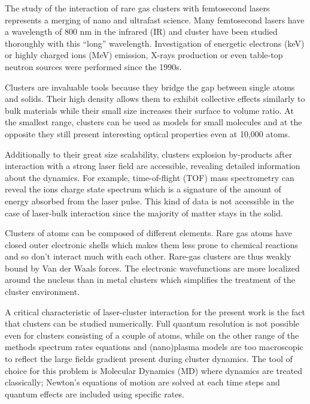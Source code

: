 The study of the interaction of rare gas clusters with femtosecond lasers represents a
merging of nano and ultrafast science.
%
Many femtosecond lasers
have a wavelength of 800 nm in the infrared (IR) and cluster have been studied
thoroughly with this ``long'' wavelength. Investigation of energetic
electrons (keV) or highly charged ions (MeV) emission, X-rays production or even
table-top neutron sources\cite{Krainov2007} were performed since the
1990s\cite{Haberland1994,Brabec2009}.

Clusters are invaluable tools because they bridge the gap between single atoms
and solids. Their high density allows them to exhibit collective effects similarly
to bulk materials while their small
size increases their surface to volume ratio.
At the smallest range, clusters can be used as models for small molecules and
at the opposite they still present interesting optical properties even at 10,000
atoms\cite{Reinhard2004}.

Additionally to their great size scalability, clusters explosion by-products
after interaction with a strong laser field are accessible, revealing detailed
information about the dynamics. For example, time-of-flight (TOF) mass
spectrometry can reveal the ions charge state spectrum which
is a signature of
%
the amount
of energy absorbed from the laser pulse. This kind of data is not accessible
in the case of laser-bulk interaction since the majority of matter stays
%
in
the solid.

Clusters of atoms can be composed of different elements. Rare gas atoms have
closed outer electronic shells which makes them less prone to chemical
reactions and so don't interact much with each other. Rare-gas clusters are
thus weakly bound by Van der Waals forces. The electronic wavefunctions are
more localized around the nucleus than in metal clusters which simplifies the
treatment of the cluster environment.


A critical characteristic of laser-cluster interaction for the present
work is the fact that clusters can be studied numerically. Full quantum resolution
is not possible even for clusters consisting of a couple of atoms, while on the
other range of the methods spectrum rates equations and (nano)plasma models are
too macroscopic to reflect the large fields gradient present during cluster
dynamics\cite{Fennel2010}. The tool of choice for this problem is Molecular Dynamics
(MD) where dynamics are treated classically; Newton's equations of motion are
solved at each time steps and quantum effects are included using specific rates.

